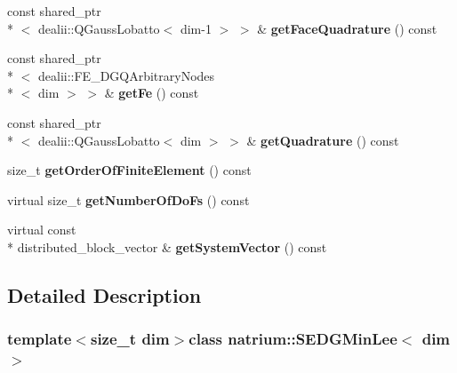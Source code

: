 \begin{DoxyCompactItemize}
\item 
\hypertarget{classnatrium_1_1SEDGMinLee_a653928dc9f0dd3715389b28196cab7bb}{const shared\-\_\-ptr\\*
$<$ dealii\-::\-Q\-Gauss\-Lobatto$<$ dim-\/1 $>$ $>$ \& {\bfseries get\-Face\-Quadrature} () const }\label{classnatrium_1_1SEDGMinLee_a653928dc9f0dd3715389b28196cab7bb}

\item 
\hypertarget{classnatrium_1_1SEDGMinLee_adb3df3ea790cb6a4d58dd9bed2e1ce1c}{const shared\-\_\-ptr\\*
$<$ dealii\-::\-F\-E\-\_\-\-D\-G\-Q\-Arbitrary\-Nodes\\*
$<$ dim $>$ $>$ \& {\bfseries get\-Fe} () const }\label{classnatrium_1_1SEDGMinLee_adb3df3ea790cb6a4d58dd9bed2e1ce1c}

\item 
\hypertarget{classnatrium_1_1SEDGMinLee_ad3ca0f23194a27d69d82d0f3ba89e345}{const shared\-\_\-ptr\\*
$<$ dealii\-::\-Q\-Gauss\-Lobatto$<$ dim $>$ $>$ \& {\bfseries get\-Quadrature} () const }\label{classnatrium_1_1SEDGMinLee_ad3ca0f23194a27d69d82d0f3ba89e345}

\item 
\hypertarget{classnatrium_1_1SEDGMinLee_a745a65de3ee72a250c0706e6c7fcc361}{size\-\_\-t {\bfseries get\-Order\-Of\-Finite\-Element} () const }\label{classnatrium_1_1SEDGMinLee_a745a65de3ee72a250c0706e6c7fcc361}

\item 
\hypertarget{classnatrium_1_1SEDGMinLee_af667cda1a894340f614da67c0a0ae5da}{virtual size\-\_\-t {\bfseries get\-Number\-Of\-Do\-Fs} () const }\label{classnatrium_1_1SEDGMinLee_af667cda1a894340f614da67c0a0ae5da}

\item 
\hypertarget{classnatrium_1_1SEDGMinLee_ac4d17489cf8bf5e98bd7bd4e3e32f0d4}{virtual const \\*
distributed\-\_\-block\-\_\-vector \& {\bfseries get\-System\-Vector} () const }\label{classnatrium_1_1SEDGMinLee_ac4d17489cf8bf5e98bd7bd4e3e32f0d4}

\end{DoxyCompactItemize}


\subsection{Detailed Description}
\subsubsection*{template$<$size\-\_\-t dim$>$class natrium\-::\-S\-E\-D\-G\-Min\-Lee$<$ dim $>$}

